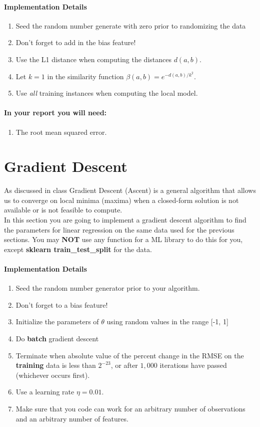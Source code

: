 \documentclass[12pt]{article}
\begin{document}
\paragraph{Implementation Details}
\begin{enumerate}
\item Seed the random number generate with zero prior to randomizing the data
\item Don't forget to add in the bias feature!
\item Use the L1 distance when computing the distances $d(a,b)$.
\item Let $k=1$ in the similarity function $\beta(a,b)= e^{-d(a,b)/k^2}$.
\item Use \emph{all} training instances when computing the local model.
\end{enumerate}


\paragraph{In your report you will need:}
\begin{enumerate}
\item The root mean squared error.
\end{enumerate}

\newpage
\section{Gradient Descent}
As discussed in class Gradient Descent (Ascent) is a general algorithm that allows us to converge on local minima (maxima) when a closed-form solution is not available or is not feasible to compute.\\

\noindent
In this section you are going to implement a gradient descent algorithm to find the parameters for linear regression on the same data used for the previous sections.  You may \textbf{NOT} use any function for a ML library to do this for you, except  \textbf{sklearn train\_test\_split} for the data.\\

\paragraph{Implementation Details}
\begin{enumerate}
\item Seed the random number generator prior to your algorithm.
\item Don't forget to a bias feature!
\item Initialize the parameters of $\theta$ using random values in the range [-1, 1]
\item Do \textbf{batch} gradient descent
\item Terminate when absolute value of the percent change in the RMSE on the \textbf{training} data is less than $2^{-23}$, or after $1,000$ iterations have passed (whichever occurs first).
\item Use a learning rate $\eta=0.01$.
\item Make sure that you code can work for an arbitrary number of observations and an arbitrary number of features.
\end{enumerate}
\end{document}
